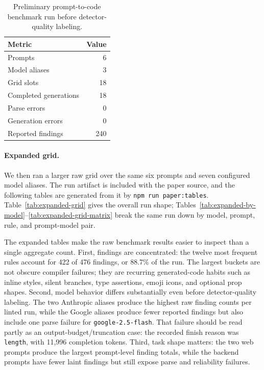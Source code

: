 \documentclass[11pt]{article}
\begin{document}
\begin{table}[ht]
  \centering
  \begin{tabular}{lr}
    \toprule
    Metric & Value \\
    \midrule
    Prompts & 6 \\
    Model aliases & 3 \\
    Grid slots & 18 \\
    Completed generations & 18 \\
    Parse errors & 0 \\
    Generation errors & 0 \\
    Reported findings & 240 \\
    \bottomrule
  \end{tabular}
  \caption{Preliminary prompt-to-code benchmark run before detector-quality labeling.}
  \label{tab:preliminary-grid}
\end{table}

\paragraph{Expanded grid.}
We then ran a larger raw grid over the same six prompts and seven configured model aliases. The run artifact is included with the paper source, and the following tables are generated from it by \texttt{npm run paper:tables}. Table~\ref{tab:expanded-grid} gives the overall run shape; Tables~\ref{tab:expanded-by-model}--\ref{tab:expanded-grid-matrix} break the same run down by model, prompt, rule, and prompt-model pair.



The expanded tables make the raw benchmark results easier to inspect than a single aggregate count. First, findings are concentrated: the twelve most frequent rules account for 422 of 476 findings, or 88.7\% of the run. The largest buckets are not obscure compiler failures; they are recurring generated-code habits such as inline styles, silent branches, type assertions, emoji icons, and optional prop shapes. Second, model behavior differs substantially even before detector-quality labeling. The two Anthropic aliases produce the highest raw finding counts per linted run, while the Google aliases produce fewer reported findings but also include one parse failure for \texttt{google-2.5-flash}. That failure should be read partly as an output-budget/truncation case: the recorded finish reason was \texttt{length}, with 11,996 completion tokens. Third, task shape matters: the two web prompts produce the largest prompt-level finding totals, while the backend prompts have fewer laint findings but still expose parse and reliability failures.
\end{document}
